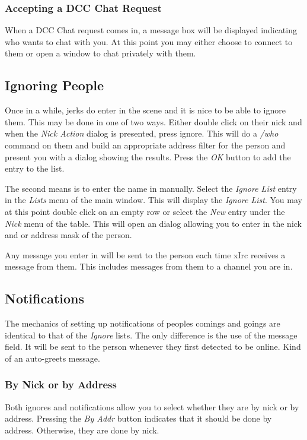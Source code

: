 \documentclass[titlepage]{article}
\begin{document}
\subsubsection{Accepting a DCC Chat Request}
When a DCC Chat request comes in, a message box will be displayed
indicating who wants to chat with you. At this point you may either choose
to connect to them or open a window to chat privately with them. 

\subsection{Ignoring People}
Once in a while, jerks do enter in the scene and it is nice to be able to
ignore them. This may be done in one of two ways. Either double click on
their nick and when the \emph{Nick Action} dialog is presented, press
ignore. This will do a \emph{/who} command on them and build an appropriate
address filter for the person and present you with a dialog showing the
results. Press the \emph{OK} button to add the entry to the list.

The second means is to enter the name in manually. Select the \emph{Ignore
List} entry in the \emph{Lists} menu of the main window. This will display
the \emph{Ignore List}. You may at this point double click on an empty row
or select the \emph{New} entry under the \emph{Nick} menu of the table.
This will open an dialog allowing you to enter in the nick and or address mask
of the person.

Any message you enter in will be sent to the person each time xIrc receives
a message from them. This includes messages from them to a channel you are
in.

\subsection{Notifications}
The mechanics of setting up notifications of peoples comings and goings are
identical to that of the \emph{Ignore} lists. The only difference is the
use of the message field. It will be sent to the person whenever they first
detected to be online. Kind of an auto-greets message.

\subsubsection{By Nick or by Address}
Both ignores and notifications allow you to select whether they are by nick
or by address. Pressing the \emph{By Addr} button indicates that it should
be done by address. Otherwise, they are done by nick.
\end{document}
